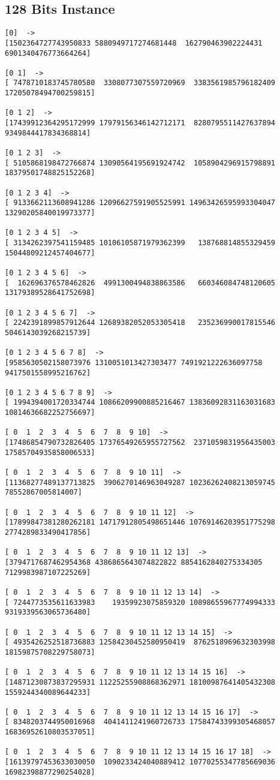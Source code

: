 \documentclass[a4paper]{article}
\begin{document}
\subsection{128 Bits Instance}
\begin{lstlisting}
[0]  -> 
[1502364727743950833 5880949717274681448  162790463902224431 6901340476773664264]

[0 1]  -> 
[ 7478710183745780580  3308077307559720969  3383561985796182409 17205078494700259815]

[0 1 2]  -> 
[17439912364295172999 17979156346142712171  8280795511427637894  9349844417834368814]

[0 1 2 3]  -> 
[ 5105868198472766874 13090564195691924742  1058904296915798891 18379501748825152268]

[0 1 2 3 4]  -> 
[ 9133662113608941286 12096627591905525991 14963426595993304047 13290205840019973377]

[0 1 2 3 4 5]  -> 
[ 3134262397541159485 10106105871979362399   138768814855329459 15044809212457404677]

[0 1 2 3 4 5 6]  ->  
[  162696376578462826  4991300494838863586   660346084748120605 13179389528641752698]

[0 1 2 3 4 5 6 7]  -> 
[ 2242391899857912644 12689382052053305418   235236990017815546  5046143039268215739]

[0 1 2 3 4 5 6 7 8]  -> 
[9585630502158073976 1310051013427303477 7491921222636097758 9417501558995216762]

[0 1 2 3 4 5 6 7 8 9]  -> 
[ 1994394001720334744 10866209900885216467 13836092831163031683 10814636682252756697]

[ 0  1  2  3  4  5  6  7  8  9 10]  -> 
[17486854790732826405 17376549265955727562  2371059831956435003 17585704935858006533]

[ 0  1  2  3  4  5  6  7  8  9 10 11]  -> 
[11368277489137713825  3906270146963049287 10236262408213059745    78552867005814007]

[ 0  1  2  3  4  5  6  7  8  9 10 11 12]  -> 
[17899847381280262181 14717912805498651446 10769146203951775298  2774289833490417856]

[ 0  1  2  3  4  5  6  7  8  9 10 11 12 13]  -> 
[3794717687462954368 4386865643074822822 8854162840275334305 7129983987107225269]

[ 0  1  2  3  4  5  6  7  8  9 10 11 12 13 14]  -> 
[ 7244773535611633983    19359923075859320 10898655967774994333  9319339563065736480]

[ 0  1  2  3  4  5  6  7  8  9 10 11 12 13 14 15]  -> 
[ 4935426252518736883 12584230452580950419  8762518969632303998 18159875708229758073]

[ 0  1  2  3  4  5  6  7  8  9 10 11 12 13 14 15 16]  -> 
[14871230873837295931 11225255908868362971 18100987641405432308  1559244340089644233]

[ 0  1  2  3  4  5  6  7  8  9 10 11 12 13 14 15 16 17]  -> 
[ 8348203744950016968  4041411241960726733 17584743399305468057 16836952610803537051]

[ 0  1  2  3  4  5  6  7  8  9 10 11 12 13 14 15 16 17 18]  -> 
[16139797453633030050  1090233424040889412 10770255347785669036 16982398877290254028]
\end{lstlisting}
\end{document}
